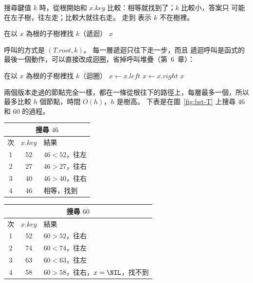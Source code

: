 搜尋鍵值 $k$ 時，從根開始和 $x.\mathit{key}$ 比較：相等就找到了；$k$ 比較小，答案只
可能在左子樹，往左走；比較大就往右走。 走到 \NIL 表示 $k$ 不在樹裡。

\begin{pseudo}[label=alg:bst-search]{在以 $x$ 為根的子樹裡找 $k$（遞迴）}
        \State \Return $x$
    \EndIf
        \State \Return {}
    \Else
        \State \Return {}
    \EndIf
\EndFunction
\end{pseudo}

呼叫的方式是 $(T.\mathit{root}, k)$。 每一層遞迴只往下走一步，而且
遞迴呼叫是函式的最後一個動作，可以直接改成迴圈，省掉呼叫堆疊（第~6~章）：

\begin{pseudo}[label=alg:bst-search-iter]{在以 $x$ 為根的子樹裡找 $k$（迴圈）}
            \State $x \gets x.\mathit{left}$
        \Else
            \State $x \gets x.\mathit{right}$
        \EndIf
    \EndWhile
    \State \Return $x$
\EndFunction
\end{pseudo}

兩個版本走過的節點完全一樣，都在一條從根往下的路徑上，每層最多一個，所以最多比較
$h$ 個節點，時間 $O(h)$，$h$ 是樹高。 下表是在圖~\ref{fig:bst-T} 上搜尋 $46$ 和 $60$ 的過程。

\begin{center}
\begin{tabular}[t]{ccl}
\toprule
\multicolumn{3}{c}{搜尋 $46$} \\
\midrule
次 & $x.\mathit{key}$ & 結果 \\
\midrule
1 & 52 & $46 < 52$，往左 \\
2 & 27 & $46 > 27$，往右 \\
3 & 40 & $46 > 40$，往右 \\
4 & 46 & 相等，找到 \\
\bottomrule
\end{tabular}\hspace{1.5em}%
\begin{tabular}[t]{ccl}
\toprule
\multicolumn{3}{c}{搜尋 $60$} \\
\midrule
次 & $x.\mathit{key}$ & 結果 \\
\midrule
1 & 52 & $60 > 52$，往右 \\
2 & 74 & $60 < 74$，往左 \\
3 & 63 & $60 < 63$，往左 \\
4 & 58 & $60 > 58$，往右，$x = \NIL$，找不到 \\
\bottomrule
\end{tabular}
\end{center}

